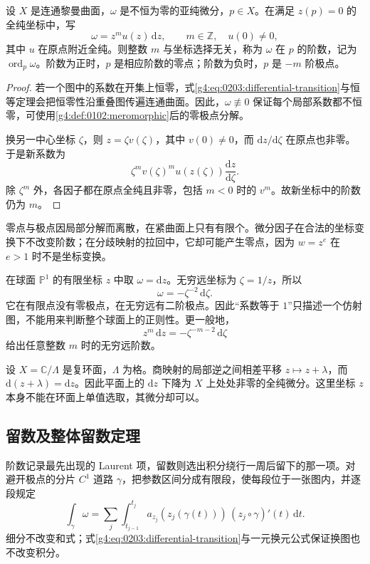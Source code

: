\begin{proposition}
	\label{g4:prop:0203:order-invariance}
	设 \(X\) 是连通黎曼曲面，\(\omega\) 是不恒为零的亚纯微分，\(p\in X\)。在满足 \(z(p)=0\) 的全纯坐标中，写
	\[
		\omega=z^m u(z)\,\mathrm{d}z,\qquad m\in\mathbb Z,\quad u(0)\ne0,
	\]
	其中 \(u\) 在原点附近全纯。则整数 \(m\) 与坐标选择无关，称为 \(\omega\) 在 \(p\) 的阶数，记为 \(\operatorname{ord}_p\omega\)。阶数为正时，\(p\) 是相应阶数的零点；阶数为负时，\(p\) 是 \(-m\) 阶极点。
\end{proposition}

\begin{proof}
	若一个图中的系数在开集上恒零，式\eqref{g4:eq:0203:differential-transition}与恒等定理会把恒零性沿重叠图传遍连通曲面。因此，\(\omega\not\equiv0\) 保证每个局部系数都不恒零，可使用\cref{g4:def:0102:meromorphic}后的零极点分解。

	换另一中心坐标 \(\zeta\)，则 \(z=\zeta v(\zeta)\)，其中 \(v(0)\ne0\)，而 \(\mathrm{d}z/\mathrm{d}\zeta\) 在原点也非零。于是新系数为
	\[
		\zeta^m v(\zeta)^m u(z(\zeta))
		\frac{\mathrm{d}z}{\mathrm{d}\zeta}.
	\]
	除 \(\zeta^m\) 外，各因子都在原点全纯且非零，包括 \(m<0\) 时的 \(v^m\)。故新坐标中的阶数仍为 \(m\)。
\end{proof}

零点与极点因局部分解而离散，在紧曲面上只有有限个。微分因子在合法的坐标变换下不改变阶数；在分歧映射的拉回中，它却可能产生零点，因为 \(w=z^e\) 在 \(e>1\) 时不是坐标变换。

\begin{example}
	\label{g4:exm:0203:sphere-differential}
	在球面 \(\mathbb P^1\) 的有限坐标 \(z\) 中取 \(\omega=\mathrm{d}z\)。无穷远坐标为 \(\zeta=1/z\)，所以
	\[
		\omega=-\zeta^{-2}\,\mathrm{d}\zeta.
	\]
	它在有限点没有零极点，在无穷远有二阶极点。因此“系数等于 \(1\)”只描述一个仿射图，不能用来判断整个球面上的正则性。更一般地，
	\[
		z^m\,\mathrm{d}z=-\zeta^{-m-2}\,\mathrm{d}\zeta
	\]
	给出任意整数 \(m\) 时的无穷远阶数。
\end{example}

\begin{example}
	\label{g4:exm:0203:torus-differential}
	设 \(X=\mathbb C/\Lambda\) 是复环面，\(\Lambda\) 为格。商映射的局部逆之间相差平移 \(z\mapsto z+\lambda\)，而 \(\mathrm{d}(z+\lambda)=\mathrm{d}z\)。因此平面上的 \(\mathrm{d}z\) 下降为 \(X\) 上处处非零的全纯微分。这里坐标 \(z\) 本身不能在环面上单值选取，其微分却可以。
\end{example}

\subsection{留数及整体留数定理}
\label{g4:subsec:0203:02}
阶数记录最先出现的 Laurent 项，留数则选出积分绕行一周后留下的那一项。对避开极点的分片 \(C^1\) 道路 \(\gamma\)，把参数区间分成有限段，使每段位于一张图内，并逐段规定
\[
	\int_\gamma\omega
	=\sum_j\int_{t_{j-1}}^{t_j}
	a_{z_j}(z_j(\gamma(t)))\,(z_j\circ\gamma)'(t)\,\mathrm{d}t.
\]
细分不改变和式；式\eqref{g4:eq:0203:differential-transition}与一元换元公式保证换图也不改变积分。

